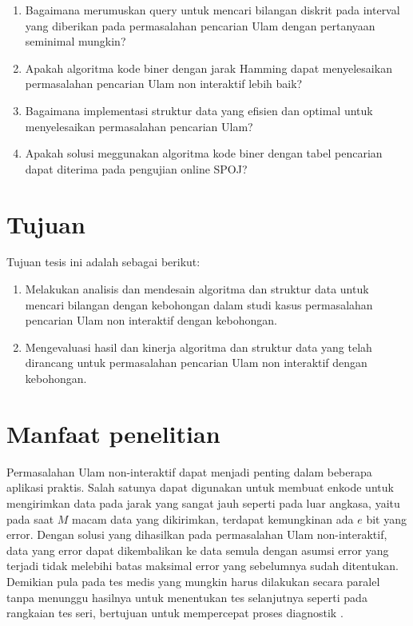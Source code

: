 \begin {enumerate}
  \item Bagaimana merumuskan query untuk mencari bilangan diskrit pada interval yang diberikan pada permasalahan pencarian Ulam dengan pertanyaan seminimal mungkin?
  \item Apakah algoritma kode biner dengan jarak Hamming dapat menyelesaikan permasalahan pencarian Ulam non interaktif lebih baik?
  \item Bagaimana implementasi struktur data yang efisien dan optimal untuk menyelesaikan permasalahan pencarian Ulam?
  \item Apakah solusi meggunakan algoritma kode biner dengan tabel pencarian dapat diterima pada pengujian online SPOJ?
\end {enumerate}


\section{Tujuan}
Tujuan tesis ini adalah sebagai berikut:

\begin{enumerate}
  \item Melakukan analisis dan mendesain algoritma dan struktur data untuk mencari bilangan dengan kebohongan dalam studi kasus permasalahan pencarian Ulam non interaktif dengan kebohongan.
  \item Mengevaluasi hasil dan kinerja algoritma dan struktur data yang telah dirancang untuk permasalahan pencarian Ulam non interaktif dengan kebohongan.
\end{enumerate}


\section{Manfaat penelitian}

Permasalahan Ulam non-interaktif dapat menjadi penting dalam beberapa aplikasi praktis. Salah satunya dapat digunakan untuk membuat enkode untuk mengirimkan data pada jarak yang sangat jauh seperti pada luar angkasa, yaitu pada saat $M$ macam data yang dikirimkan, terdapat kemungkinan ada $e$ bit yang error. Dengan solusi yang dihasilkan pada permasalahan Ulam non-interaktif, data yang error dapat dikembalikan ke data semula dengan asumsi error yang terjadi tidak melebihi batas maksimal error yang sebelumnya sudah ditentukan. Demikian pula pada tes medis yang mungkin harus dilakukan secara paralel tanpa menunggu hasilnya untuk menentukan tes selanjutnya seperti pada rangkaian tes seri, bertujuan untuk mempercepat proses diagnostik \cite{Pelc2002}.


